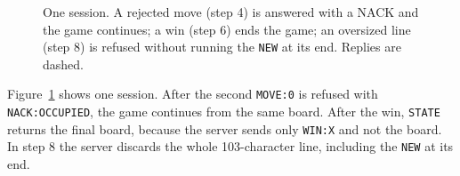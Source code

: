 \begin{figure}[t]
\centering

\caption{One session. A rejected move (step 4) is answered with a NACK and
the game continues; a win (step 6) ends the game; an oversized line (step 8) is
refused without running the \texttt{NEW} at its end. Replies are dashed.}
\label{fig:sequence}
\end{figure}

Figure~\ref{fig:sequence} shows one session. After the second \texttt{MOVE:0}
is refused with \texttt{NACK:OCCUPIED}, the game continues from the same
board. After the win, \texttt{STATE} returns the final board, because the
server sends only \texttt{WIN:X} and not the board. In step 8 the server
discards the whole 103-character line, including the \texttt{NEW} at its end.
